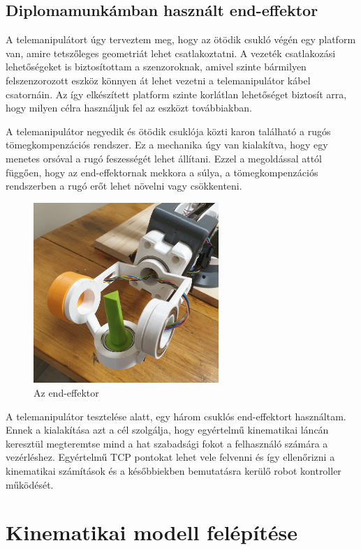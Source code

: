 \subsection{Diplomamunkámban használt end-effektor}

A telemanipulátort úgy terveztem meg, hogy az ötödik csukló végén egy platform van, amire tetszőleges geometriát lehet csatlakoztatni. A vezeték csatlakozási lehetőségeket is biztosítottam a szenzoroknak, amivel szinte bármilyen felszenzorozott eszköz könnyen át lehet vezetni a telemanipulátor kábel csatornáin. Az így elkészített platform szinte korlátlan lehetőséget biztosít arra, hogy milyen célra használjuk fel az eszközt továbbiakban.

A telemanipulátor negyedik és ötödik csuklója közti karon található a rugós tömegkompenzációs rendszer. Ez a mechanika úgy van kialakítva, hogy egy menetes orsóval a rugó feszességét lehet állítani. Ezzel a megoldással attól függően, hogy az end-effektornak mekkora a súlya, a tömegkompenzációs rendszerben a rugó erőt lehet növelni vagy csökkenteni.

\begin{figure}[!ht]
\centering
\includegraphics[width=70mm, keepaspectratio]{figures/Szumma/end_effektor}
\caption{Az end-effektor}
\label{fig:EE_fektor}
\end{figure}

A telemanipulátor tesztelése alatt, egy három csuklós end-effektort használtam. Ennek a kialakítása azt a cél szolgálja, hogy egyértelmű kinematikai láncán keresztül megteremtse mind a hat szabadsági fokot a felhasználó számára a vezérléshez. Egyértelmű TCP pontokat lehet vele felvenni és így ellenőrizni a kinematikai számítások és a későbbiekben bemutatásra kerülő robot kontroller működését.


\section{Kinematikai modell felépítése}

